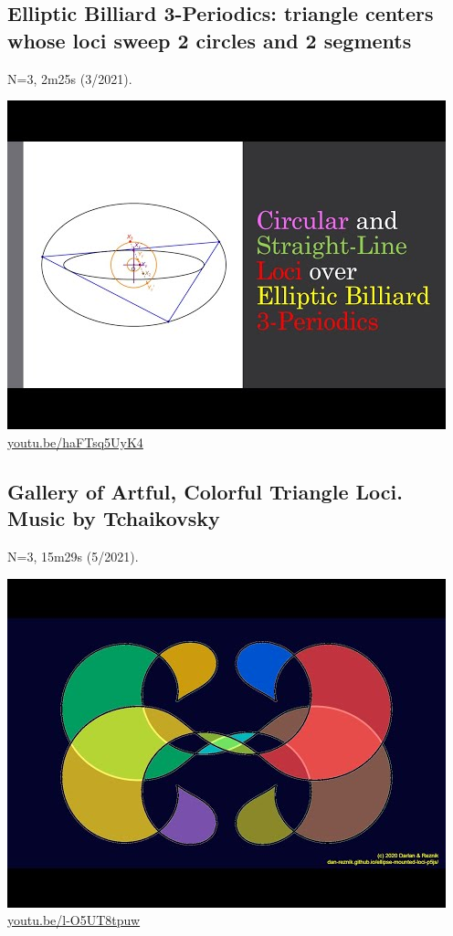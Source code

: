 \documentclass[12pt]{amsart}
\begin{document}
\subsection{Elliptic Billiard 3-Periodics: triangle centers whose loci sweep 2 circles and 2 segments}
\label{vid:haFTsq5UyK4}
\noindent N=3, 2m25s (3/2021). 
\begin{center}\includegraphics[width=.5\textwidth]{pics/haFTsq5UyK4.jpg} \\ 
\href{https://youtu.be/haFTsq5UyK4}{\url{youtu.be/haFTsq5UyK4}}\end{center}
% 

\subsection{Gallery of Artful, Colorful Triangle Loci. Music by Tchaikovsky}
\label{vid:l-O5UT8tpuw}
\noindent N=3, 15m29s (5/2021). 
\begin{center}\includegraphics[width=.5\textwidth]{pics/l-O5UT8tpuw.jpg} \\ 
\href{https://youtu.be/l-O5UT8tpuw}{\url{youtu.be/l-O5UT8tpuw}}\end{center}
% 
\end{document}
